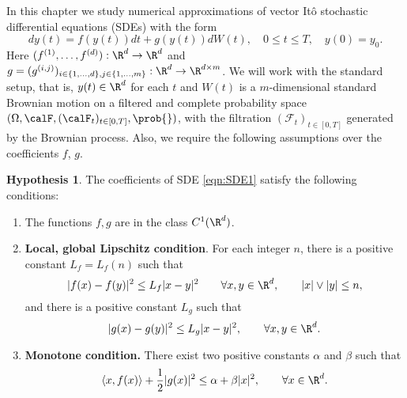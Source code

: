 \documentclass[3p]{elsarticle}
\theoremstyle{definition}
\newtheorem{hypothesis}{Hypothesis}[section]
\theoremstyle{plain}%
\theoremstyle{remark}
\newcommand{\innerprod}[2]{\left\langle#1, #2\right\rangle}
\begin{document}
In this chapter we  study numerical approximations of vector It\^o stochastic differential equations (SDEs) with the 
form
\begin{equation}\label{eqn:SDE1}
	dy(t)
	=f(y(t))dt + g(y(t))dW(t), \quad 0\leq t\leq T,
	\quad y(0)=y_0.
\end{equation}
Here $(f^{(1)},\dots, f^{(d)}):\R^d \to \R^d$ and 
$g = (g^{(i,j)})_{i\in \{1,\dots,d\}, j\in\{1,\dots, m\}}:\R^d \to \R^{d\times m}$.
We will work with the standard setup, that is,  $y(t)\in \R^d$ for each $t$ and  $W(t)$ is a
$m$-dimensional standard Brownian motion on a filtered and complete probability space
$
	(
		\Omega ,\calF,(\calF_t)_{t\in[0,T]},\prob{}
	)
$,
with the filtration
$(\mathcal{F}_t)_{t\in[0,T]}$  generated by the Brownian process.
%
Also, we require the following assumptions over the coefficients 
	$f %
	$,
	$
		g %
	$.
\begin{hypothesis}\label{ass:OSLC}
	The coefficients of SDE \eqref{eqn:SDE1} satisfy the following conditions:
	\begin{enumerate}[({H}-1)]
		\item \label{ass:C1Functions}
		The functions $f,g$ are in the class $C^{1}(\R^d)$.
		\item
		\textbf{Local, global Lipschitz condition}. For each integer $n$, there is a positive
		constant $L_{f}=L_{f}(n)$ such that
		$$
		|f(x)-f(y)|^2 %
		\leq L_{f}|x-y|^2 \qquad \forall x,y \in \R^d, \qquad |x|\vee|y|\leq n,
		$$
		and there is a positive constant $L_g$ such that
		$$
		|g(x)-g(y)|^2 \leq L_{g}|x-y|^2,
		\qquad  \forall x,y \in \R^d.
		$$ 
		\item\label{ass:MonotoneCondition}
		\textbf{Monotone condition.} There exist two positive constants $\alpha$ and $\beta$
		such that
		\begin{equation}\label{eqn:MonotoneCondition}
		\innerprod{x}{f(x)} +\frac{1}{2}|g(x)|^2
		\leq \alpha +\beta |x|^2, \qquad \forall x \in \R^d.
		\end{equation}
	\end{enumerate}
\end{hypothesis}
%
\end{document}
